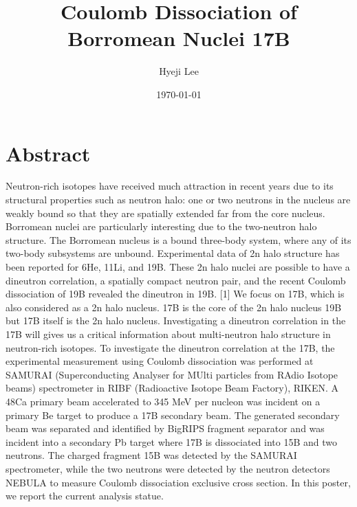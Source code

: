 \documentclass[a4j,12pt]{report}
\title{Coulomb Dissociation of Borromean Nuclei 17B}
\author{Hyeji Lee}
\date{\today}
\begin{document}
\frontmatter
\maketitle
{}
\clearpage

\thispagestyle{empty}

\clearpage

\thispagestyle{empty}
\chapter*{Abstract}
Neutron-rich isotopes have received much attraction in recent years due to its structural properties such as neutron halo: one or two neutrons in the nucleus are weakly bound so that they are spatially extended far from the core nucleus. Borromean nuclei are particularly interesting due to the two-neutron halo structure. The Borromean nucleus is a bound three-body system, where any of its two-body subsystems are unbound. Experimental data of 2n halo structure has been reported for 6He, 11Li, and 19B. These 2n halo nuclei are possible to have a dineutron correlation, a spatially compact neutron pair, and the recent Coulomb dissociation of 19B revealed the dineutron in 19B. [1] We focus on 17B, which is also considered as a 2n halo nucleus. 17B is the core of the 2n halo nucleus 19B but 17B itself is the 2n halo nucleus. Investigating a dineutron correlation in the 17B will gives us a critical information about multi-neutron halo structure in neutron-rich isotopes.
To investigate the dineutron correlation at the 17B, the experimental measurement using Coulomb dissociation was performed at SAMURAI (Superconducting Analyser for MUlti particles from RAdio Isotope beams) spectrometer in RIBF (Radioactive Isotope Beam Factory), RIKEN. A 48Ca primary beam accelerated to 345 MeV per nucleon was incident on a primary Be target to produce a 17B secondary beam. The generated secondary beam was separated and identified by BigRIPS fragment separator and was incident into a secondary Pb target where 17B is dissociated into 15B and two neutrons. The charged fragment 15B was detected by the SAMURAI spectrometer, while the two neutrons were detected by the neutron detectors NEBULA to measure Coulomb dissociation exclusive cross section. In this poster, we report the current analysis statue.

\clearpage
\tableofcontents


\mainmatter
{}














\backmatter




\end{document}
